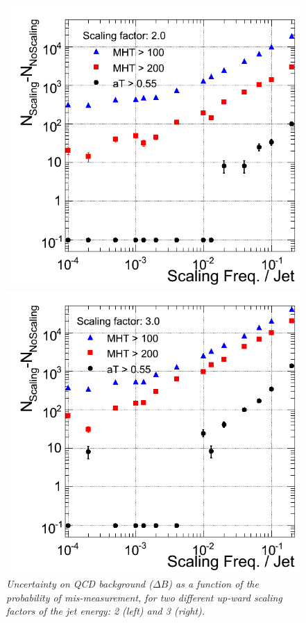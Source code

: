 \begin{figure}[h!]
\begin{minipage}[b]{0.5\linewidth}
\centering
\includegraphics[scale=0.37]{./plots/DNentries_Scale2.png} 
\end{minipage}
\begin{minipage}[b]{0.5\linewidth}
\centering
\includegraphics[scale=0.37]{./plots/DNentries_Scale3.png} 
\end{minipage}
\caption{\textit{Uncertainty on QCD background ($\Delta B$) as a function of the probability of mis-measurement, for two different up-ward scaling factors of the jet energy: 2 (left) and 3 (right).  } }
\label{fig:scale4}
\end{figure}

